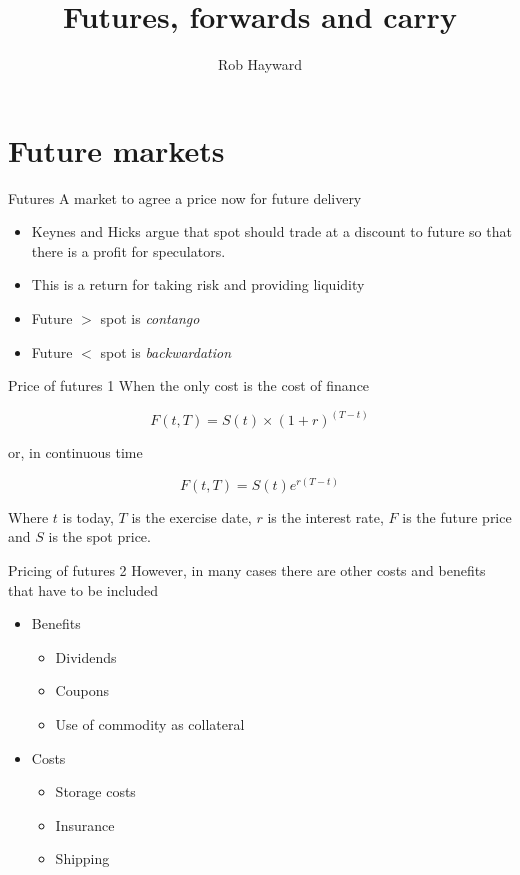 \documentclass[14pt,xcolor=pdftex,dvipsnames,table]{beamer}\usepackage[]{graphicx}\usepackage[]{color}
\title{Futures, forwards and carry}
\author{Rob Hayward}
\begin{document}
\begin{frame}
\titlepage
\end{frame}

\section{Future markets}
\begin{frame}{Futures}
A market to agree a price now for future delivery
\begin{itemize}[<+-| alert@+>]
\item Keynes and Hicks argue that spot should trade at a discount to future so that there is a profit for speculators.
\item This is a return for taking risk and providing liquidity
\item Future $>$ spot is \emph{contango}
\item Future $<$ spot is \emph{backwardation} 
\end{itemize}
\end{frame}

\begin{frame}{Price of futures 1}
When the only cost is the cost of finance
\begin{block}{}
\begin{equation}
F(t, T) = S(t) \times (1+r)^{(T-t)}
\end{equation}
\end{block}
or, in continuous time
\begin{block}{}
\begin{equation}
F(t, T) = S(t)e^{r(T-t)}
\end{equation}
\end{block}
Where $t$ is today, $T$ is the exercise date, $r$ is the interest rate, $F$ is the future price and $S$ is the spot price. 
\end{frame}

\begin{frame}{Pricing of futures 2}
However, in many cases there are other costs and benefits that have to be included
\begin{itemize}[<+-| alert@+>]
\item Benefits
\begin{itemize}
\item Dividends
\item Coupons
\item Use of commodity as collateral
\end{itemize}
\item Costs
\begin{itemize}
\item Storage costs
\item Insurance
\item Shipping 
\end{itemize}
\end{itemize}
\end{frame}
\end{document}
